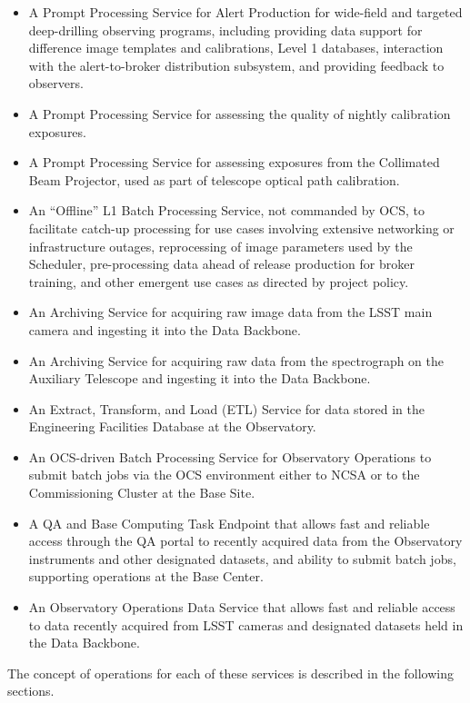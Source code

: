 \begin{itemize}
\item  A Prompt Processing Service for Alert Production for wide-field and 
targeted deep-drilling observing programs, including providing data support for 
difference image templates and calibrations, Level 1 databases, interaction with 
the alert-to-broker distribution subsystem, and providing feedback to observers.
\item  A Prompt Processing Service for assessing the quality of nightly 
calibration exposures.
\item  A Prompt Processing Service for assessing exposures from the Collimated 
Beam Projector, used as part of telescope optical path calibration.
\item  An “Offline” L1 Batch Processing Service, not commanded by OCS, to 
facilitate catch-up processing for use cases involving extensive networking or 
infrastructure outages, reprocessing of image parameters used by the Scheduler, 
pre-processing data ahead of release production for broker training, and other 
emergent use cases as directed by project policy.
\item  An Archiving Service for acquiring raw image data from the LSST main 
camera and ingesting it into the Data Backbone.
\item  An Archiving Service for acquiring raw data from the spectrograph on the 
Auxiliary Telescope and ingesting it into the Data Backbone.
\item  An Extract, Transform, and Load (ETL) Service for data stored in the 
Engineering Facilities Database at the Observatory.
\item  An OCS-driven Batch Processing Service for Observatory Operations to 
submit batch jobs via the OCS environment either to NCSA or to the Commissioning 
Cluster at the Base Site.
\item  A QA and Base Computing Task Endpoint that allows fast and reliable access 
through the QA portal to recently acquired data from the Observatory instruments 
and other designated datasets, and ability to submit batch jobs, supporting 
operations at the Base Center.
\item  An Observatory Operations Data Service that allows fast and reliable 
access to data recently acquired from LSST cameras and designated datasets held 
in the Data Backbone.
\end{itemize}

The concept of operations for each of these services is described in the 
following sections.

